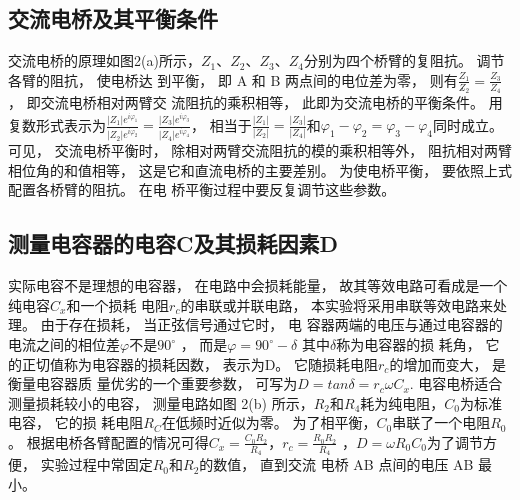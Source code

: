 \documentclass[10pt,a4paper,twocolumn,twoside,UTF8]{ctexart}
\begin{document}
\subsection{交流电桥及其平衡条件}
		交流电桥的原理如图2(a)所示，$Z_1$、$Z_2$、$Z_3$、$Z_4$分别为四个桥臂的复阻抗。 调节各臂的阻抗， 使电桥达
		到平衡， 即 A 和 B 两点间的电位差为零， 则有ܼ$\frac{Z_1}{Z_2}=\frac{Z_3}{Z_4}$， 即交流电桥相对两臂交
		流阻抗的乘积相等， 此即为交流电桥的平衡条件。 用复数形式表示为$\frac{|Z_1|e^{i \varphi_1}}{|Z_2|e^{i \varphi_2}}=\frac{|Z_3|e^{i \varphi_3}}{|Z_4|e^{i \varphi_4}}$，
		相当于$\frac{|Z_1|}{|Z_2|}=\frac{|Z_3|}{|Z_4|}$和$\varphi_1-\varphi_2=\varphi_3-\varphi_4$同时成立。
		可见， 交流电桥平衡时， 除相对两臂交流阻抗的模的乘积相等外， 阻抗相对两臂
		相位角的和值相等， 这是它和直流电桥的主要差别。 为使电桥平衡， 要依照上式配置各桥臂的阻抗。 在电
		桥平衡过程中要反复调节这些参数。		%
	
		\subsection{测量电容器的电容C及其损耗因素D}
		实际电容不是理想的电容器， 在电路中会损耗能量， 故其等效电路可看成是一个纯电容$C_x$和一个损耗
		电阻$r_c$的串联或并联电路， 本实验将采用串联等效电路来处理。 由于存在损耗， 当正弦信号通过它时， 电
		容器两端的电压与通过电容器的电流之间的相位差$\varphi$不是$90^{\circ}$ ， 而是$\varphi=90^{\circ}-\delta$ 其中$\delta$称为电容器的损
		耗角， 它的正切值称为电容器的损耗因数， 表示为D。 它随损耗电阻$r_c$的增加而变大， 是衡量电容器质
		量优劣的一个重要参数， 可写为$D=tan\delta=r_c \omega C_x$.
		电容电桥适合测量损耗较小的电容， 测量电路如图 2(b) 所示，$R_2$和$R_4$耗为纯电阻，$C_0$为标准电容， 它的损
		耗电阻$R_C$在低频时近似为零。 为了相平衡，$C_0$串联了一个电阻$R_0$。 根据电桥各臂配置的情况可得$C_x=\frac{C_0 R_2}{R_4}$，$r_c=\frac{R_0 R_2}{R_4}$ ，$D=\omega R_0 C_0$为了调节方便， 实验过程中常固定$R_0$和$R_2$的数值， 直到交流
		电桥 AB 点间的电压 AB 最小。
\end{document}
